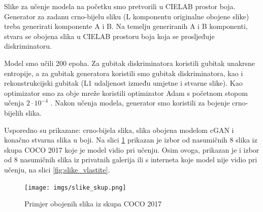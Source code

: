 
Slike za učenje modela na početku smo pretvorili u CIELAB prostor boja. Generator za zadanu crno-bijelu sliku (L komponentu originalne obojene slike) treba generirati komponente A i B.
Na temelju generiranih A i B komponenti, stvara se obojena slika u CIELAB prostoru boja koja se prosljeđuje diskriminatoru.

Model smo učili 200 epoha. Za gubitak diskriminatora koristili gubitak unakrsne entropije, a za gubitak generatora koristili smo gubitak diskriminatora, kao i rekonstrukcijski gubitak (L1 udaljenost između umjetne i stvarne slike). Kao optimizator smo za obje mreže koristili optimizator Adam s početnom stopom učenja $2 \cdot 10^{-4}$ .
Nakon učenja modela, generator smo koristili za bojenje crno-bijelih slika. 

Usporedno su prikazane: crno-bijela slika,  slika obojena modelom cGAN i konačno stvarna slika u boji. Na slici \ref{fig:slike_skup} prikazan je izbor od nasumičnih 8 slika iz skupa COCO 2017 koje je model vidio pri učenju. Osim ovoga, prikazan je i izbor od 8 nasumičnih slika iz privatnih galerija ili s interneta koje model nije vidio pri učenju, na slici \ref{fig:slike_vlastite}.

\begin{figure}[H]
    \centering
    \texttt{[image: imgs/slike\_skup.png]}
    \caption{Primjer obojenih slika iz skupa COCO 2017}
    \label{fig:slike_skup}
\end{figure}


